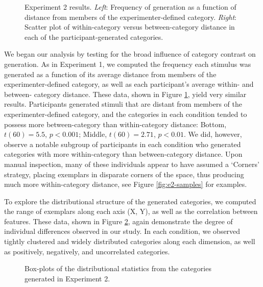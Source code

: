 \documentclass[12pt]{article}
\newcommand\inputpgf[2]{{
\let\pgfimageWithoutPath\pgfimage
\renewcommand{\pgfimage}[2][]{\pgfimageWithoutPath[##1]{#1/##2}}

}}
\begin{document}
\begin{flushleft}
\begin{figure}
    \begin{center} \inputpgf{figs/}{e2-distanceplots.pgf}
    \caption{Experiment 2 results. {\em Left}: Frequency of generation as a
function of distance from members of the experimenter-defined category. {\em
Right}: Scatter plot of within-category versus between-category distance in each
of the participant-generated categories.}
    \label{fig:e2-distanceplots}
    \end{center}
\end{figure}

We began our analysis by testing for the broad influence of category contrast on
generation. As in Experiment 1, we computed the frequency each stimulus was
generated as a function of its average distance from members of the
experimenter-defined category, as well as each participant's average within- and
between- category distance. These data, shown in Figure
\ref{fig:e2-distanceplots}, yield very similar results. Participants generated
stimuli that are distant from members of the experimenter-defined category, and
the categories in each condition tended to possess more between-category than
within-category distance: Bottom, $t(60) = 5.5$, $p < 0.001$; Middle, $t(60) =
2.71$, $p < 0.01$. We did, however, observe a notable subgroup of participants
in each condition who generated categories with more within-category than
between-category distance. Upon manual inspection, many of these individuals
appear to have assumed a `Corners' strategy, placing exemplars in disparate
corners of the space, thus producing much more within-category distance, see
Figure \ref{fig:e2-samples} for examples.

To explore the distributional structure of the generated categories, we computed
the range of exemplars along each axis (X, Y), as well as the correlation
between features. These data, shown in Figure \ref{fig:e2-statsboxes}, again
demonstrate the degree of individual differences observed in our study. In each
condition, we observed tightly clustered and widely distributed categories along
each dimension, as well as positively, negatively, and uncorrelated categories.

\begin{figure}
    \begin{center} \inputpgf{figs/}{e2-statsboxes.pgf}
    \caption{Box-plots of the distributional statistics from the categories
generated in Experiment 2. }
    \label{fig:e2-statsboxes}
    \end{center}
\end{figure}



\end{flushleft}
\end{document}
